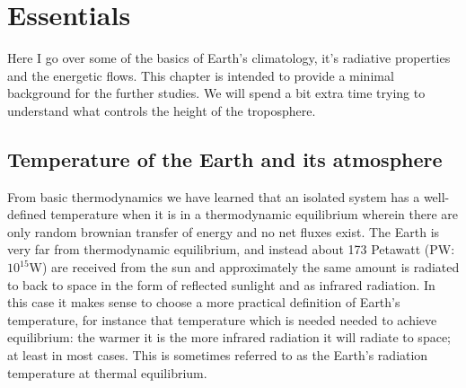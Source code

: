 \documentclass[12pt]{book}
\begin{document}



\mainmatter
\chapter{Essentials}
\label{chapter:essentials}
Here I go over some of the basics of Earth's climatology, it's radiative properties and the energetic flows. This chapter is intended to provide a minimal background for the further studies. We will spend a bit extra time trying to understand what controls the height of the troposphere. 

\section{Temperature of the Earth and its atmosphere}
From basic thermodynamics we have learned that an isolated system has a well-defined temperature when it is in a thermodynamic equilibrium wherein there are only random brownian transfer of energy and no net fluxes exist. The Earth is very far from thermodynamic equilibrium, and instead about 173 Petawatt (PW: $10^{15}$W) are received from the sun and approximately the same amount is radiated to back to space in the form of reflected sunlight and as infrared radiation. In this case it makes sense to choose a more practical definition of Earth's temperature, for instance that temperature which is needed  needed to achieve equilibrium: the warmer it is the more infrared radiation it will radiate to space; at least in most cases. This is sometimes referred to as the Earth's radiation temperature at thermal equilibrium.
\end{document}
